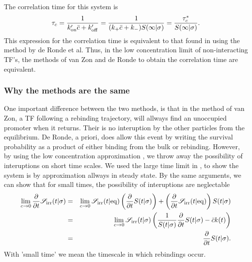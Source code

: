 The correlation time for this system is
\begin{equation}
 \tau_c = \frac{1}{k'_{\rm on} \bar{c} + k'_{\rm off}} = \frac{1}{ (k_+ \bar{c} + k_- ) S(\infty|\sigma) } = \frac{\tau_c^*}{S(\infty|\sigma)}.
\end{equation}
This expression for the correlation time is equivalent to that found in  using the method by de Ronde et al. Thus, in the low concentration limit of non-interacting TF's, the methods of van Zon and de Ronde to obtain the correlation time are equivalent.

\subsubsection{Why the methods are the same}
One important difference between the two methods, is that in the method of van Zon, a TF following a rebinding trajectory, will allways find an unoccupied promoter when it returns. Their is no interuption by the other particles from the equilibrium. De Ronde, a priori, does allow this event by writing the survival probability as a product of either binding from the bulk or rebinding. However, by using the low concentration approximation , we throw away the possibility of interuptions on short time scales. We used the large time limit in , to show the system is by approximation allways in steady state. By the same arguments, we can show that for small times, the possibility of interuptions are neglectable
\begin{eqnarray}
 \lim_{c\to0} \frac{\partial }{\partial t} \mathscr{S}_{\rm irr}(t|\sigma) & = & \lim_{c\to0} \mathscr{S}_{\rm irr}(t|{\rm eq}) \left( \frac{\partial }{\partial t}S(t|\sigma) \right)+\left( \frac{\partial }{\partial t} \mathscr{S}_{\rm irr}(t|{\rm eq}) \right) S(t|\sigma) \nonumber \\
 & = & \lim_{c\to0} \mathscr{S}_{\rm irr}(t|\sigma) \left( \frac{1}{S(t|\sigma)} \frac{\partial }{\partial t} S(t|\sigma) - \bar{c} k(t) \right) \\
 & = & \frac{\partial }{\partial t} S(t|\sigma).
\end{eqnarray}
With 'small time' we mean the timescale in which rebindings occur.